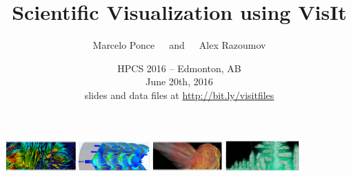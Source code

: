 \documentclass[xcolor=svgnames]{beamer}
\begin{document}
\title[VisIt Workshop]{\Large\bf Scientific Visualization using VisIt}
\author[\textbf{M.Ponce} \& \textbf{A.Razoumov}]{\Large {\sc Marcelo Ponce}~~~and~~~{\sc Alex Razoumov}}
\date[HPCS 2016]{HPCS 2016 -- Edmonton, AB \\ June 20th, 2016 \\ slides and data files at \url{http://bit.ly/visitfiles}}

\begin{frame}
  \centering
\href{https://wci.llnl.gov/simulation/computer-codes/visit/}{\includegraphics[height=1.15cm]{./figs/visit-logos/VisIt-01}} \href{https://wci.llnl.gov/simulation/computer-codes/visit/}{\includegraphics[height=1.15cm]{./figs/visit-logos/VisIt-02}} \href{https://wci.llnl.gov/simulation/computer-codes/visit/}{\includegraphics[height=1.15cm]{./figs/visit-logos/VisIt-03}} \href{https://wci.llnl.gov/simulation/computer-codes/visit/}{\includegraphics[height=1.15cm]{./figs/visit-logos/VisIt-04}}

  \vspace{-.25cm}

  \titlepage
\end{frame}
\end{document}
